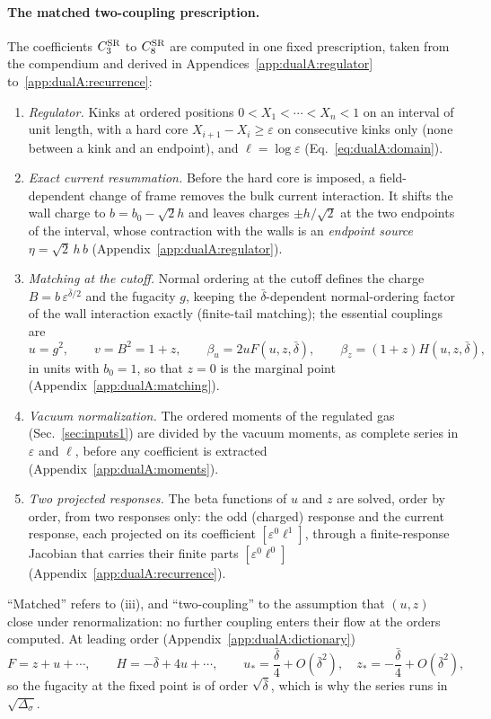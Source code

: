 \documentclass[11pt,a4paper]{article}
\numberwithin{equation}{section}
\newcommand{\Ds}{\Delta_\sigma}
\newcommand{\CSR}{C^{\rm SR}}
\newcommand{\db}{\bar\delta}
\begin{document}
\paragraph{The matched two-coupling prescription.} The coefficients $\CSR_3$ to $\CSR_8$ are computed in one fixed
prescription, taken from the compendium and derived in Appendices~\ref{app:dualA:regulator}
to~\ref{app:dualA:recurrence}:
\begin{enumerate}[label=(\roman*),leftmargin=2em]
\item \emph{Regulator.} Kinks at ordered positions $0<X_1<\cdots<X_n<1$ on an interval of unit length, with a hard core
 $X_{i+1}-X_i\ge\varepsilon$ on consecutive kinks only (none between a kink and an endpoint), and $\ell=\log\varepsilon$
 (Eq.~\eqref{eq:dualA:domain}).
\item \emph{Exact current resummation.} Before the hard core is imposed, a field-dependent change of frame removes the
 bulk current interaction. It shifts the wall charge to $b=b_0-\sqrt2h$ and leaves charges $\pm h/\sqrt2$ at the two
 endpoints of the interval, whose contraction with the walls is an \emph{endpoint source} $\eta=\sqrt2\,h\,b$
 (Appendix~\ref{app:dualA:regulator}).
\item \emph{Matching at the cutoff.} Normal ordering at the cutoff defines the charge $B=b\,\varepsilon^{\db/2}$ and
 the fugacity $g$, keeping the $\db$-dependent normal-ordering factor of the wall interaction exactly (finite-tail
 matching); the essential couplings are
 \begin{equation}
  u=g^2,\qquad v=B^2=1+z,\qquad \beta_u=2uF(u,z,\db),\qquad \beta_z=(1+z)H(u,z,\db),
 \end{equation}
 in units with $b_0=1$, so that $z=0$ is the marginal point (Appendix~\ref{app:dualA:matching}).
\item \emph{Vacuum normalization.} The ordered moments of the regulated gas (Sec.~\ref{sec:inputs1}) are divided by the
 vacuum moments, as complete series in $\varepsilon$ and $\ell$, before any coefficient is extracted
 (Appendix~\ref{app:dualA:moments}).
\item \emph{Two projected responses.} The beta functions of $u$ and $z$ are solved, order by order, from two responses
 only: the odd (charged) response and the current response, each projected on its coefficient
 $[\varepsilon^0\ell^1]$, through a finite-response Jacobian that carries their finite parts $[\varepsilon^0\ell^0]$
 (Appendix~\ref{app:dualA:recurrence}).
\end{enumerate}
``Matched'' refers to (iii), and ``two-coupling'' to the assumption that $(u,z)$ close under renormalization: no
further coupling enters their flow at the orders computed. At leading order
(Appendix~\ref{app:dualA:dictionary})
\begin{equation}
 F=z+u+\cdots,\qquad H=-\db+4u+\cdots,\qquad u_*=\frac{\db}{4}+O(\db^2),\quad z_*=-\frac{\db}{4}+O(\db^2),
\end{equation}
so the fugacity at the fixed point is of order $\sqrt{\db}$, which is why the series runs in $\sqrt{\Ds}$.
\end{document}

